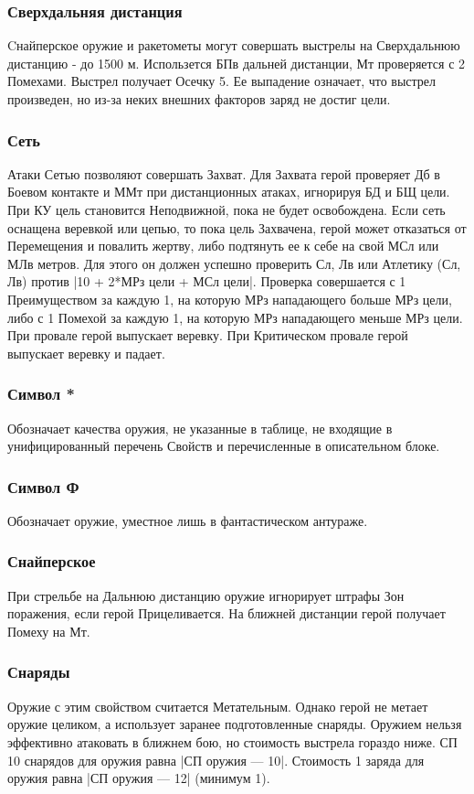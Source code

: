 \subsubsection{Сверхдальняя дистанция} Cнайперское оружие и ракетометы могут совершать выстрелы на Сверхдальнюю дистанцию - до 1500 м. Использется БПв дальней дистанции, Мт проверяется с 2 Помехами. Выстрел получает Осечку 5. Ее выпадение означает, что выстрел произведен, но из-за неких внешних факторов заряд не достиг цели.
\subsubsection{Сеть} Атаки Сетью позволяют совершать Захват. Для Захвата герой проверяет Дб в Боевом контакте и ММт при дистанционных атаках, игнорируя БД и БЩ цели. При КУ цель становится Неподвижной, пока не будет освобождена. 
\newline Если сеть оснащена веревкой или цепью, то пока цель Захвачена, герой может отказаться от Перемещения и повалить жертву, либо подтянуть ее к себе на свой МСл или МЛв метров.  Для этого он должен успешно проверить Сл, Лв или Атлетику (Сл, Лв) против |10 + 2*МРз цели + МСл цели|.  
\newline Проверка совершается с 1 Преимуществом за каждую 1, на которую МРз нападающего больше МРз цели, либо с 1 Помехой за каждую 1, на которую МРз нападающего меньше МРз цели. При провале герой выпускает веревку. При Критическом провале герой выпускает веревку и падает. 
\subsubsection{Символ *} Обозначает качества оружия, не указанные в таблице, не входящие в унифицированный перечень Свойств и перечисленные в описательном блоке.
\subsubsection{Символ Ф} Обозначает оружие, уместное лишь в фантастическом антураже.
\subsubsection{Снайперское} При стрельбе на Дальнюю дистанцию оружие игнорирует штрафы Зон поражения, если герой Прицеливается. На ближней дистанции герой получает Помеху на Мт.
\subsubsection{Снаряды} Оружие с этим свойством считается Метательным. Однако герой не метает оружие целиком, а использует заранее подготовленные снаряды. Оружием нельзя эффективно атаковать в ближнем бою, но стоимость выстрела гораздо ниже. СП 10 снарядов для оружия равна |СП оружия — 10|. Стоимость 1 заряда для оружия равна |СП оружия — 12| (минимум 1). 

